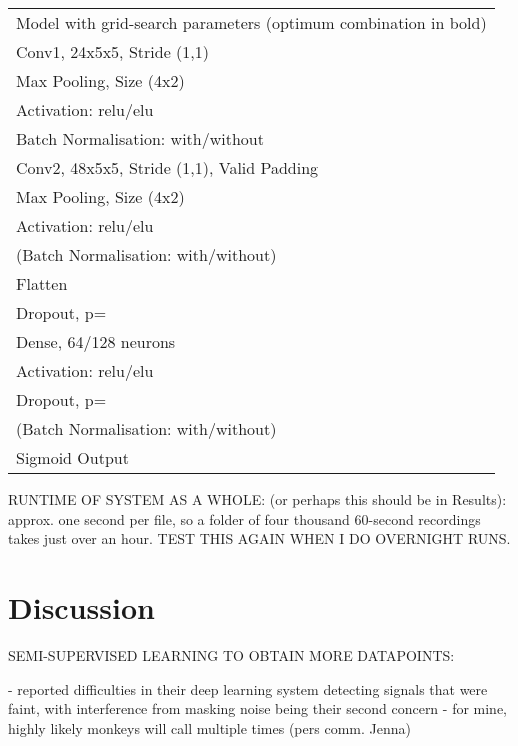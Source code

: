 \documentclass[11pt]{article}
\begin{document}
\begin{table}[]
\begin{tabular}{l}
Model with grid-search parameters (optimum combination in bold) \\
Conv1, 24x5x5, Stride (1,1)                                     \\
Max Pooling, Size (4x2)                                         \\
Activation: relu/elu                                            \\
Batch Normalisation: with/without                               \\
Conv2, 48x5x5, Stride (1,1), Valid Padding                      \\
Max Pooling, Size (4x2)                                         \\
Activation: relu/elu                                            \\
(Batch Normalisation: with/without)                             \\
Flatten                                                         \\
Dropout, p=                                                     \\
Dense, 64/128 neurons                                           \\
Activation: relu/elu                                            \\
Dropout, p=                                                     \\
(Batch Normalisation: with/without)                             \\
Sigmoid Output                                                 
\end{tabular}
\end{table}

RUNTIME OF SYSTEM AS A WHOLE: (or perhaps this should be in Results): approx. one second per file, so a folder of four thousand 60-second recordings takes just over an hour. TEST THIS AGAIN WHEN I DO OVERNIGHT RUNS.

\section{Discussion}

SEMI-SUPERVISED LEARNING TO OBTAIN MORE DATAPOINTS: 

- \citep{stowell2018automatic} reported difficulties in their deep learning system detecting signals that were faint, with interference from masking noise being their second concern
- for mine, highly likely monkeys will call multiple times (pers comm. Jenna) 
\end{document}
